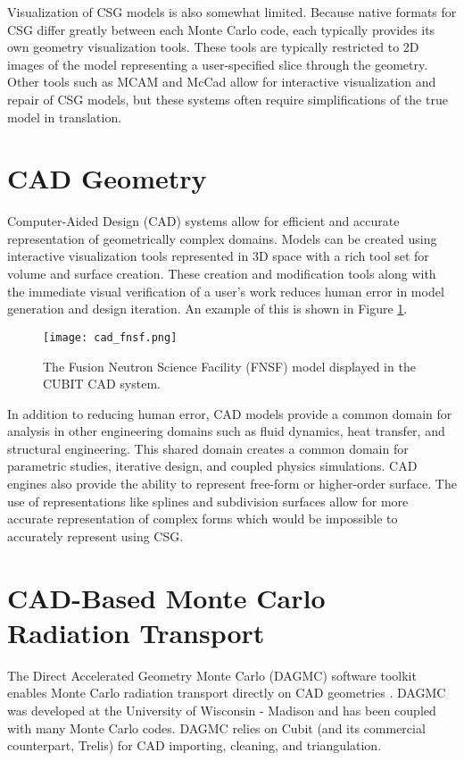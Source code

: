 Visualization of CSG models is also somewhat limited. Because native formats for
CSG differ greatly between each Monte Carlo code, each typically provides its
own geometry visualization tools. These tools are typically restricted to 2D
images of the model representing a user-specified slice through the
geometry. Other tools such as MCAM \cite{Liu_2005} and McCad
\cite{Tsigetamirat_2008} allow for interactive visualization and repair of CSG
models, but these systems often require simplifications of the true model in
translation.

\section{CAD Geometry}

Computer-Aided Design (CAD) systems allow for efficient and accurate representation of geometrically
complex domains. Models can be created using interactive visualization tools
represented in 3D space with a rich tool set for volume and surface
creation. These creation and modification tools along with the immediate visual
verification of a user's work reduces human error in model generation and design
iteration. An example of this is shown in Figure \ref{fig:cad_fnsf}.

\begin{figure}[H]
  \centering
  \texttt{[image: cad\_fnsf.png]}
  \caption{The Fusion Neutron Science Facility (FNSF)\cite{Kessel_2017} model
    displayed in the CUBIT \cite{Blacker_1994} CAD system.}
  \label{fig:cad_fnsf}
\end{figure}

In addition to reducing human error, CAD models provide a common domain for
analysis in other engineering domains such as fluid dynamics, heat transfer, and
structural engineering. This shared domain creates a common domain for
parametric studies, iterative design, and coupled physics simulations. CAD
engines also provide the ability to represent free-form or higher-order
surface. The use of representations like splines and subdivision surfaces allow
for more accurate representation of complex forms which would be impossible to
accurately represent using CSG.

\section{CAD-Based Monte Carlo Radiation Transport}

The Direct Accelerated Geometry Monte Carlo (DAGMC) software toolkit enables
Monte Carlo radiation transport directly on CAD geometries
\cite{Tautges_2009}. DAGMC was developed at the University of Wisconsin -
Madison and has been coupled with many Monte Carlo codes. DAGMC relies on
Cubit\cite{Blacker_1994} (and its commercial counterpart, Trelis\cite{Trelis_2018}) for CAD
importing, cleaning, and triangulation.

